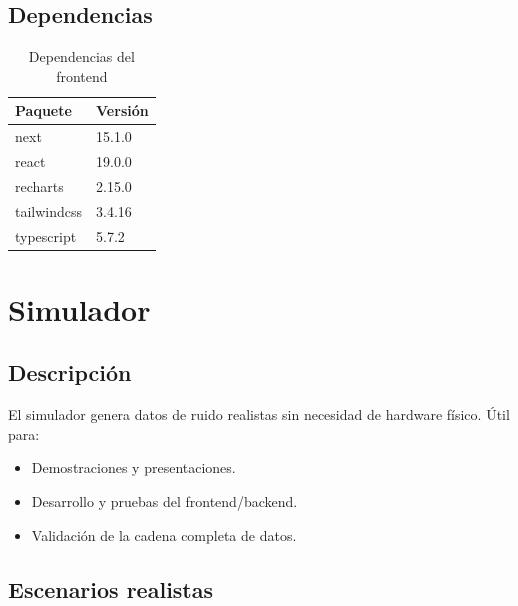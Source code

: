 \documentclass[12pt,a4paper]{report}
\begin{document}
\section{Dependencias}

\begin{table}[H]
\centering
\begin{tabular}{ll}
\toprule
\textbf{Paquete} & \textbf{Versi\'on} \\
\midrule
next & 15.1.0 \\
react & 19.0.0 \\
recharts & 2.15.0 \\
tailwindcss & 3.4.16 \\
typescript & 5.7.2 \\
\bottomrule
\end{tabular}
\caption{Dependencias del frontend}
\end{table}

\chapter{Simulador}

\section{Descripci\'on}

El simulador genera datos de ruido realistas sin necesidad de hardware f\'isico. \'Util para:

\begin{itemize}
    \item Demostraciones y presentaciones.
    \item Desarrollo y pruebas del frontend/backend.
    \item Validaci\'on de la cadena completa de datos.
\end{itemize}

\section{Escenarios realistas}
\end{document}
